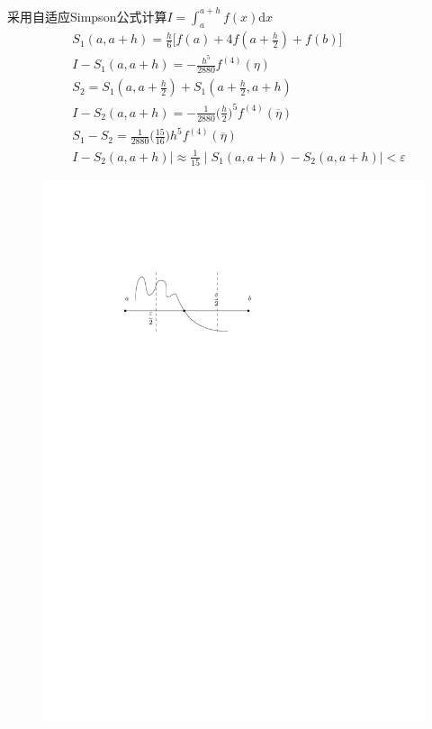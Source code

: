 \begin{note}
    采用自适应Simpson公式计算$I=\int_{a}^{a+h}f(x)\mathrm{d}x$
    \[
        \begin{aligned}
            &S_{1}(a,a+h)=\frac{h}{6}\biggl[f(a)+4f(a+\frac{h}{2})+f(b)\biggr] \\
            &I-S_{1}(a,a+h)=-\frac{h^{5}}{2880}f^{(4)}(\eta) \\
            &S_{2}=S_{1}(a,a+\frac{h}{2})+S_{1}(a+\frac{h}{2},a+h) \\
            &I-S_{2}(a,a+h)=-\frac{1}{2880}\biggl(\frac{h}{2}\biggr)^{5}f^{(4)}(\overline{\eta}) \\
            & S_1-S_2 =  \frac{1}{2880}\biggl(\frac{15}{16}\biggr)h^{5}f^{(4)}(\overline{\eta})\\
            &I-S_{2}(a,a+h)\mid\approx\frac{1}{15}\mid S_{1}(a,a+h)-S_{2}(a,a+h)\mid <\varepsilon
        \end{aligned}
    \]
    \begin{figure}[htbp]
        \centering
        \includegraphics{image/自适应Simpson.pdf}
    \end{figure}
\end{note}

